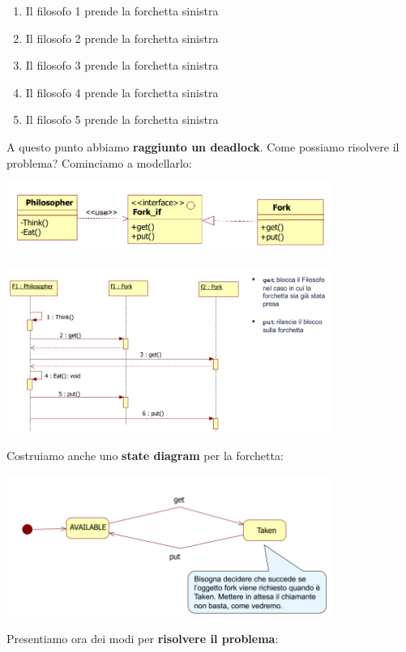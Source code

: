 \documentclass[12pt]{article}
\begin{document}
\begin{enumerate}
    \item Il filosofo 1 prende la forchetta sinistra
    \item Il filosofo 2 prende la forchetta sinistra
    \item Il filosofo 3 prende la forchetta sinistra
    \item Il filosofo 4 prende la forchetta sinistra
    \item Il filosofo 5 prende la forchetta sinistra
\end{enumerate}
A questo punto abbiamo \textbf{raggiunto un deadlock}. Come possiamo risolvere il problema? Cominciamo a modellarlo:
\begin{center}
    \includegraphics[width = 0.80\textwidth]{Images/106.png}
\end{center}
\begin{center}
    \includegraphics[width = 0.80\textwidth]{Images/107.png}
\end{center}
Costruiamo anche uno \textbf{state diagram} per la forchetta:
\begin{center}
    \includegraphics[width = 0.80\textwidth]{Images/108.png}
\end{center}
Presentiamo ora dei modi per \textbf{risolvere il problema}:
\end{document}
